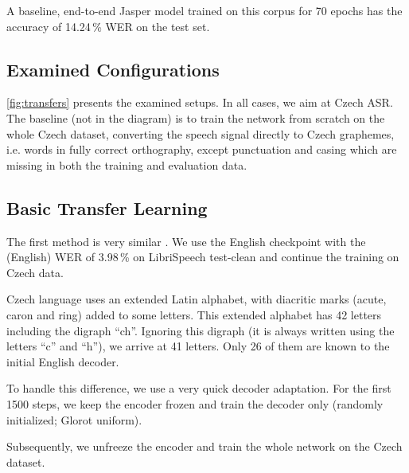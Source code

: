 A baseline, end-to-end Jasper model trained on this corpus for 70 epochs has the accuracy of 14.24\,\% WER on the test set.

\subsection{Examined Configurations}

\cref{fig:transfers} presents the examined setups. In all cases, we aim at Czech ASR. The baseline (not in the diagram) is to train the network from scratch on the whole Czech dataset, converting the speech signal directly to Czech graphemes, i.e. words in fully correct orthography, except punctuation and casing which are missing in both the training and evaluation data.


\subsection{Basic Transfer Learning}
\label{basic_transfer}

The first method is very similar . We use the English checkpoint with the (English) WER of 3.98\,\% on LibriSpeech test-clean and continue the training on Czech data.

Czech language uses an extended Latin alphabet, with diacritic marks (acute, caron and ring) added to some letters. This extended alphabet has 42 letters including the digraph ``ch''. Ignoring this digraph (it is always written using the letters ``c'' and ``h''), we arrive at 41 letters. Only 26 of them are known to the initial English decoder.

To handle this difference, we use a very quick decoder adaptation. For the first 1500 steps, we keep the encoder frozen and train the decoder only (randomly initialized; Glorot uniform).


Subsequently, we unfreeze the encoder and train the whole network on the Czech dataset.


